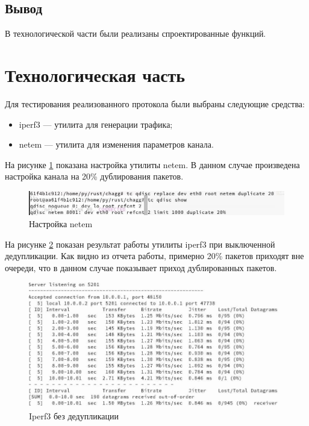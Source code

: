 \documentclass[14pt, a4paper]{extarticle}
\begin{document}
\subsection{Вывод}
В технологической части были реализаны спроектированные функций.

\section{Технологическая часть}
Для тестирования реализованного протокола были выбраны следующие средства:
\begin{itemize}
	\item iperf3 --- утилита для генерации трафика;
	\item netem --- утилита для изменения параметров канала.
\end{itemize}

На рисунке \ref{setnetem} показана настройка утилиты netem. В данном случае произведена настройка канала на 20\% дублирования пакетов.
\begin{figure}[H]
	\centering
	\includegraphics[scale=0.7]{setnetem.jpg}
	\caption{Настройка netem}
	\label{setnetem}
\end{figure}

На рисунке \ref{resoff} показан результат работы утилиты iperf3 при выключенной дедупликации. Как видно из отчета работы, примерно 20\% пакетов приходят вне очереди, что в данном случае показывает приход дублированных пакетов.
\begin{figure}[H]
	\centering
	\includegraphics[scale=0.7]{resoff.jpg}
	\caption{Iperf3 без дедупликации}
	\label{resoff}
\end{figure}
\end{document}

